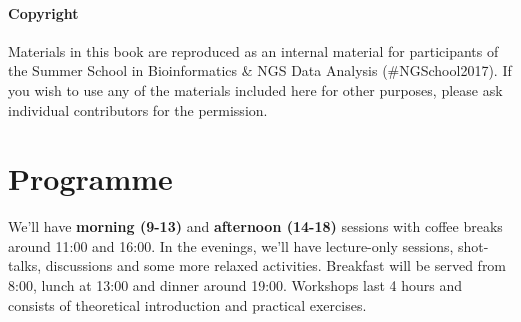 \documentclass[a4paper,11pt]{book}
\begin{document}
\smallskip 
\paragraph{Copyright}
Materials in this book are reproduced as an internal material for
participants of the Summer School in Bioinformatics \& NGS Data Analysis (\#NGSchool2017).
If you wish to use any of the materials included here for other purposes,
please ask individual contributors for the permission. 


\tableofcontents

\newpage
\section*{Programme}
We’ll have {\bf morning (9-13)} and {\bf afternoon (14-18)} sessions with coffee breaks around 11:00 and 16:00.
In the evenings, we'll have lecture-only sessions, shot-talks, discussions and some more relaxed activities. 
Breakfast will be served from 8:00, lunch at 13:00 and dinner around 19:00. 
Workshops last 4 hours and consists of theoretical introduction and practical exercises. \\
\end{document}
